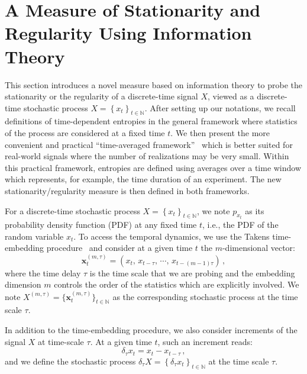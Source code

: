 \documentclass[aps,pra,groupedaddress,notitlepage]{revtex4-1}
\begin{document}
\section{A Measure of Stationarity and Regularity Using Information Theory}
\label{sec:theory}


This section introduces a novel measure based on information theory to probe the stationarity or the regularity of a discrete-time signal $X$, viewed as a discrete-time stochastic process $X=\left\lbrace x_t \right\rbrace_{t\in\mathbb{N}}$.
After setting up our notations, we recall definitions of time-dependent entropies in the general framework where statistics of the process are considered at a fixed time $t$. We then present the more convenient and practical ``time-averaged framework''~\cite{GraneroBelinchon2019} which is better suited for real-world signals where the number of realizations may be very small. Within this practical framework, entropies are defined using averages over a time window which represents, for example, the time duration of an experiment.
The new stationarity/regularity measure is then defined in both frameworks.



For a discrete-time stochastic process $X=\left\lbrace x_t \right\rbrace_{t\in\mathbb{N}}$, we note $p_{x_t}$ as its probability density function (PDF) at any fixed time $t$, {i.e.}, the PDF of the random variable $x_t$. 
%
To access the temporal dynamics, we use the Takens time-embedding procedure~\cite{Takens1981} and consider at a given time $t$ the $m$-dimensional vector: 
\begin{equation}
\textbf{x}_t^{(m,\tau)}=\left(x_t, \,x_{t-\tau}, \, \cdots, \, x_{t-(m-1)\tau}\right)\,, \label{eq:def:embed}
\end{equation}
where the time delay $\tau$ is the time scale that we are probing and the embedding dimension $m$ controls the order of the statistics which are explicitly involved. 
We note $X^{(m,\tau)}=\{\textbf{x}_t^{(m,\tau)}\}_{t\in\mathbb{N}}$ as the corresponding stochastic process at the time scale $\tau$.



In addition to the time-embedding procedure, we also consider increments of the signal $X$ at time-scale $\tau$. At a given time $t$, such an increment reads:
\begin{equation}\delta_{\tau}x_t=x_t-x_{t-\tau} \,, \label{eq:def:inc}
\end{equation}
and we define the stochastic process $\delta_\tau X=\left\lbrace \delta_\tau x_t \right\rbrace_{t\in\mathbb{N}}$ at the time scale $\tau$.
\end{document}
